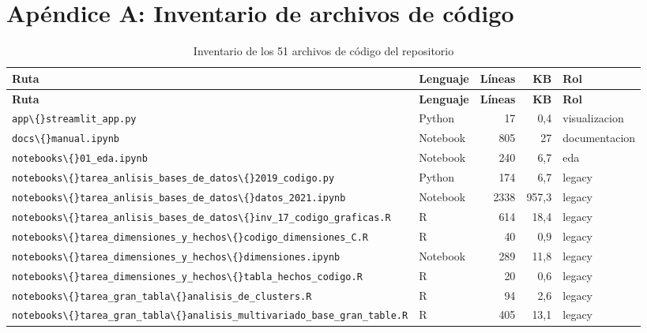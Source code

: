 \section{Apéndice A: Inventario de archivos de código}

\begingroup
\scriptsize
\begin{longtable}{>{\raggedright\arraybackslash}p{6.2cm} l rr >{\raggedright\arraybackslash}p{3.0cm}}
\caption{Inventario de los 51 archivos de código del repositorio}
\label{tab:inventario}\\
\toprule
\textbf{Ruta} & \textbf{Lenguaje} & \textbf{Líneas} & \textbf{KB} & \textbf{Rol} \\
\midrule
\endfirsthead
\toprule
\textbf{Ruta} & \textbf{Lenguaje} & \textbf{Líneas} & \textbf{KB} & \textbf{Rol} \\
\midrule
\endhead
    \texttt{app\textbackslash\{\}streamlit\_app.py} & Python & 17 & 0,4 & visualizacion \\
    \texttt{docs\textbackslash\{\}manual.ipynb} & Notebook & 805 & 27 & documentacion \\
    \texttt{notebooks\textbackslash\{\}01\_eda.ipynb} & Notebook & 240 & 6,7 & eda \\
    \texttt{notebooks\textbackslash\{\}tarea\_anlisis\_bases\_de\_datos\textbackslash\{\}2019\_codigo.py} & Python & 174 & 6,7 & legacy \\
    \texttt{notebooks\textbackslash\{\}tarea\_anlisis\_bases\_de\_datos\textbackslash\{\}datos\_2021.ipynb} & Notebook & 2338 & 957,3 & legacy \\
    \texttt{notebooks\textbackslash\{\}tarea\_anlisis\_bases\_de\_datos\textbackslash\{\}inv\_17\_codigo\_graficas.R} & R & 614 & 18,4 & legacy \\
    \texttt{notebooks\textbackslash\{\}tarea\_dimensiones\_y\_hechos\textbackslash\{\}codigo\_dimensiones\_C.R} & R & 40 & 0,9 & legacy \\
    \texttt{notebooks\textbackslash\{\}tarea\_dimensiones\_y\_hechos\textbackslash\{\}dimensiones.ipynb} & Notebook & 289 & 11,8 & legacy \\
    \texttt{notebooks\textbackslash\{\}tarea\_dimensiones\_y\_hechos\textbackslash\{\}tabla\_hechos\_codigo.R} & R & 20 & 0,6 & legacy \\
    \texttt{notebooks\textbackslash\{\}tarea\_gran\_tabla\textbackslash\{\}analisis\_de\_clusters.R} & R & 94 & 2,6 & legacy \\
    \texttt{notebooks\textbackslash\{\}tarea\_gran\_tabla\textbackslash\{\}analisis\_multivariado\_base\_gran\_table.R} & R & 405 & 13,1 & legacy \\

\end{longtable}
